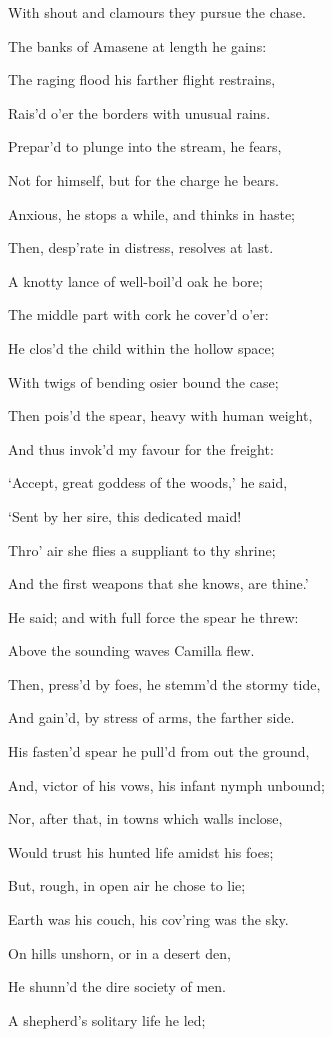 With shout and clamours they pursue the chase.

The banks of Amasene at length he gains:

The raging flood his farther flight restrains,

Rais’d o’er the borders with unusual rains.

Prepar’d to plunge into the stream, he fears,

Not for himself, but for the charge he bears.

Anxious, he stops a while, and thinks in haste;

Then, desp’rate in distress, resolves at last.

A knotty lance of well-boil’d oak he bore;

The middle part with cork he cover’d o’er:

He clos’d the child within the hollow space;

With twigs of bending osier bound the case;

Then pois’d the spear, heavy with human weight,

And thus invok’d my favour for the freight:

‘Accept, great goddess of the woods,’ he said,

‘Sent by her sire, this dedicated maid!

Thro’ air she flies a suppliant to thy shrine;

And the first weapons that she knows, are thine.’

He said; and with full force the spear he threw:

Above the sounding waves Camilla flew.

Then, press’d by foes, he stemm’d the stormy tide,

And gain’d, by stress of arms, the farther side.

His fasten’d spear he pull’d from out the ground,

And, victor of his vows, his infant nymph unbound;

Nor, after that, in towns which walls inclose,

Would trust his hunted life amidst his foes;

But, rough, in open air he chose to lie;

Earth was his couch, his cov’ring was the sky.

On hills unshorn, or in a desert den,

He shunn’d the dire society of men.

A shepherd’s solitary life he led;

